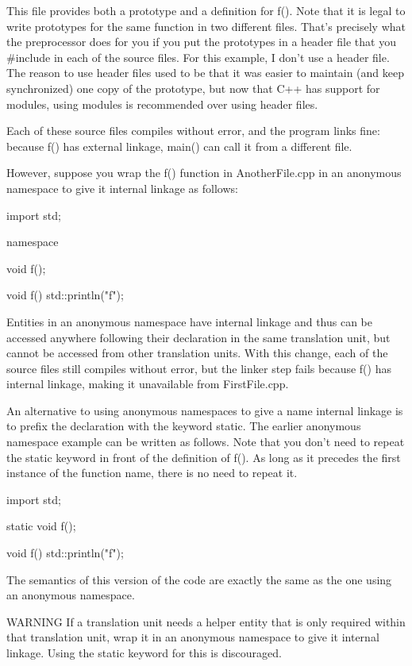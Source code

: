 This file provides both a prototype and a definition for f(). Note that it is legal to write prototypes for the same function in two different files. That’s precisely what the preprocessor does for you if you put the prototypes in a header file that you \#include in each of the source files. For this example, I don’t use a header file. The reason to use header files used to be that it was easier to maintain (and keep synchronized) one copy of the prototype, but now that C++ has support for modules, using modules is recommended over using header files.

Each of these source files compiles without error, and the program links fine: because f() has external linkage, main() can call it from a different file.

However, suppose you wrap the f() function in AnotherFile.cpp in an anonymous namespace to give it internal linkage as follows:

\begin{cpp}
import std;

namespace
{
    void f();

    void f()
    {
        std::println("f");
    }
}
\end{cpp}

Entities in an anonymous namespace have internal linkage and thus can be accessed anywhere following their declaration in the same translation unit, but cannot be accessed from other translation units. With this change, each of the source files still compiles without error, but the linker step fails because f() has internal linkage, making it unavailable from FirstFile.cpp.

An alternative to using anonymous namespaces to give a name internal linkage is to prefix the declaration with the keyword static. The earlier anonymous namespace example can be written as follows. Note that you don’t need to repeat the static keyword in front of the definition of f(). As long as it precedes the first instance of the function name, there is no need to repeat it.

\begin{cpp}
import std;

static void f();

void f()
{
    std::println("f");
}
\end{cpp}

The semantics of this version of the code are exactly the same as the one using an anonymous namespace.

\begin{myWarning}{WARNING}
If a translation unit needs a helper entity that is only required within that translation unit, wrap it in an anonymous namespace to give it internal linkage. Using the static keyword for this is discouraged.
\end{myWarning}

